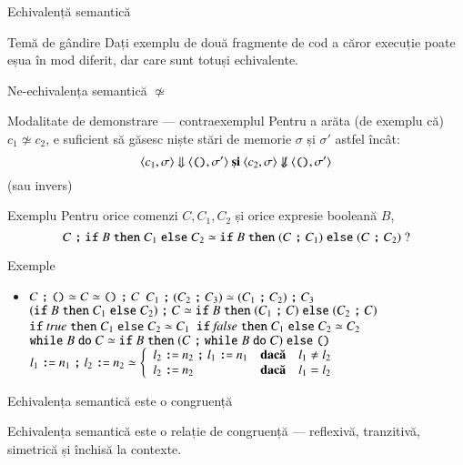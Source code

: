 \begin{section}{Echivalență semantică}
\begin{frame}{}
\vfill
\begin{block}{Temă de gândire}
Dați exemplu de două fragmente de cod a căror execuție poate eșua în mod diferit, dar care sunt totuși echivalente.
\end{block}
\end{frame}

\begin{frame}{Ne-echivalența semantică $\not\simeq$}

\begin{block}{Modalitate de demonstrare — contraexemplul}
	Pentru a arăta (de exemplu că) $c_1\not\simeq c_2$, e suficient să găsesc niște stări de memorie $\sigma$ și $\sigma'$ astfel încât:
\[\S{\c{c_1,\sigma}}{\c{\Sskip,\sigma'}} \textbf{ și }\c{c_2,\sigma} \not\Downarrow \c{\Sskip,\sigma'}\]
(sau invers)
\end{block}

\begin{block}{Exemplu}
Pentru orice comenzi $C, C_1, C_2$ și orice expresie booleană $B$,
\[{ C \terminal{;}{\Sif B \Sthen C_1 \Selse C_2}}  \simeq {\Sif B \Sthen (C \terminal{;} C_1) \Selse (C \terminal{;} C_2)}\mbox{ ?}\]
\end{block}
\end{frame}

\begin{frame}{}{Exemple}
\begin{itemize}
\item $C\terminal{;} {\Sskip} \simeq C \simeq {\Sskip}\terminal{;} C$ 
\vitem $C_1 \terminal{;} (C_2 \terminal{;} C_3) \simeq (C_1 \terminal{;} C_2) \terminal{;} C_3$ 
\vitem $({\Sif B \Sthen C_1 \Selse C_2}) \terminal{;} C  \simeq {\Sif B \Sthen (C_1 \terminal{;} C) \Selse (C_2 \terminal{;} C)}$ 
\vitem $\Sif {\Strue} \Sthen C_1 \Selse C_2 \simeq C_1$
\vitem $\Sif {\Sfalse} \Sthen C_1 \Selse C_2 \simeq C_2$
\vitem $\Swhile  B \Sdo C \simeq {\Sif B \Sthen (C \terminal{;} {\Swhile  B \Sdo C}) \Selse {\Sskip}}$
\vitem $l_1 \terminal{:=} n_1 \terminal{;} l_2 \terminal{:=} n_2\simeq \left\{\begin{array}{lll} l_2 \terminal{:=} n_2 \terminal{;} l_1 \terminal{:=} n_1 & \textbf{dacă} & l_1 \neq l_2
\\ l_2 \terminal{:=} n_2 & \textbf{dacă} & l_1 = l_2 \end{array}\right.$ 
\end{itemize}
\end{frame}

\begin{frame}{Echivalența semantică este o congruență}
\begin{theorem}
Echivalența semantică este o relație de congruență — reflexivă, tranzitivă, simetrică și închisă la contexte.
\end{theorem}


\end{frame}
\end{section}
